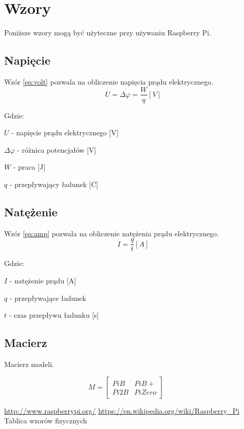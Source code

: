 \documentclass[titlepage]{article}
\begin{document}
\newpage
\section{Wzory}
Poniższe wzory\cite{wz} mogą być użyteczne przy używaniu Raspberry Pi.
\subsection{Napięcie}
Wzór \ref{eq:volt} pozwala na obliczenie napięcia prądu elektrycznego.
\begin{equation}
\label{eq:volt} U = \Delta\varphi = \frac{W}{q}[V] 
\end{equation}

Gdzie:

$ U $ - napięcie prądu elektrycznego [V]

$ \Delta\varphi $ - różnica potencjałów [V]

$ W $ - praca [J]

$ q $ - przepływający ładunek [C]

\subsection{Natężenie}
Wzór \ref{eq:amp} pozwala na obliczenie natężenia prądu elektrycznego.
\begin{equation}
\label{eq:amp}
I = \frac{q}{t}[A]
\end{equation} 

Gdzie:

$ I $ - natężenie prądu [A]

$ q $ - przepływające ładunek

$ t $ - czas przepływu ładunku [s]

\subsection{Macierz}
Macierz modeli.

\begin{equation}
      M = \left[
        \begin{array}{cc}
         Pi B & Pi B+\\
         Pi 2 B & Pi Zero
         \end{array}
      \right]
      \qquad 
\end{equation}


\newpage
\begin{thebibliography}{99}
 \url{http://www.raspberrypi.org/}
 \url{https://en.wikipedia.org/wiki/Raspberry_Pi}
 Tablica wzorów fizycznych
\end{thebibliography}
\end{document}
